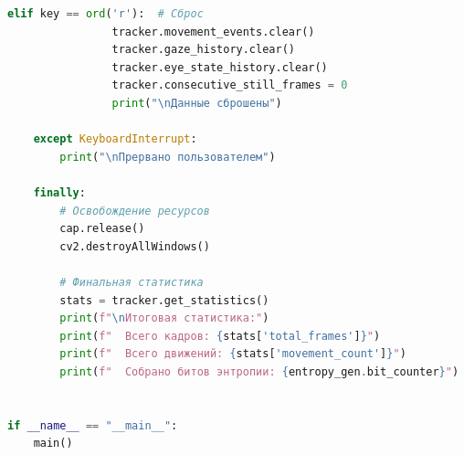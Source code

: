 \documentclass[14pt, a4paper]{extreport}
\begin{document}
\begin{lstlisting}[language=Python, caption={Файл: EyeTracker.py (основной модуль)}]
            elif key == ord('r'):  # Сброс
                tracker.movement_events.clear()
                tracker.gaze_history.clear()
                tracker.eye_state_history.clear()
                tracker.consecutive_still_frames = 0
                print("\nДанные сброшены")
    
    except KeyboardInterrupt:
        print("\nПрервано пользователем")
    
    finally:
        # Освобождение ресурсов
        cap.release()
        cv2.destroyAllWindows()
        
        # Финальная статистика
        stats = tracker.get_statistics()
        print(f"\nИтоговая статистика:")
        print(f"  Всего кадров: {stats['total_frames']}")
        print(f"  Всего движений: {stats['movement_count']}")
        print(f"  Собрано битов энтропии: {entropy_gen.bit_counter}")


if __name__ == "__main__":
    main()
\end{lstlisting}
\end{document}
